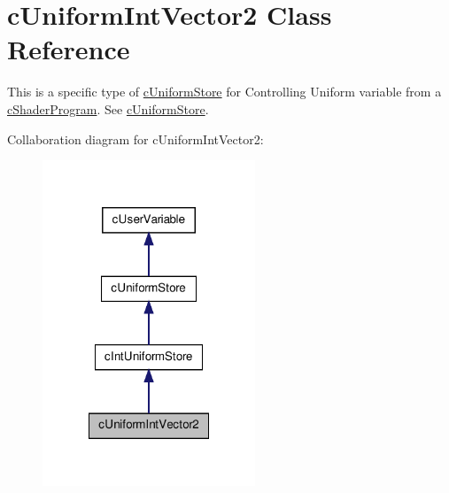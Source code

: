 \hypertarget{classc_uniform_int_vector2}{
\section{cUniformIntVector2 Class Reference}
\label{classc_uniform_int_vector2}
}


This is a specific type of \hyperlink{classc_uniform_store}{cUniformStore} for Controlling Uniform variable from a \hyperlink{classc_shader_program}{cShaderProgram}. See \hyperlink{classc_uniform_store}{cUniformStore}.  




Collaboration diagram for cUniformIntVector2:\nopagebreak
\begin{figure}[H]
\begin{center}
\leavevmode
\includegraphics[width=180pt]{classc_uniform_int_vector2__coll__graph}
\end{center}
\end{figure}
